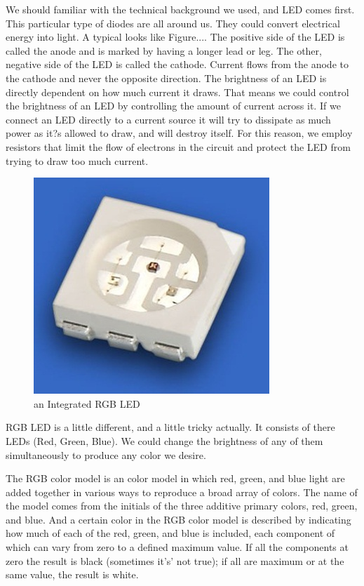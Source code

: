 \documentclass[12pt,a4paper,journal]{IEEEtran}
\begin{document}
We should familiar with the technical background we used, and LED comes first. This particular type of diodes are all around us. They could convert electrical energy into light. A typical looks like Figure.... The positive side of the LED is called the anode and is marked by having a longer lead or leg. The other, negative side of the LED is called the cathode. Current flows from the anode to the cathode and never the opposite direction. The brightness of an LED is directly dependent on how much current it draws. That means we could control the brightness of an LED by controlling the amount of current across it. If we connect an LED directly to a current source it will try to dissipate as much power as it?s allowed to draw, and will destroy itself. For this reason, we employ resistors that limit the flow of electrons in the circuit and protect the LED from trying to draw too much current.
\begin{figure}[ht]
  \centering
  \includegraphics[width=0.9\linewidth]{rgbled.jpg}
  \caption{an Integrated RGB LED}
  \label{fig:rgbled}
\end{figure}
RGB LED is a little different, and a little tricky actually. It consists of there LEDs (Red, Green, Blue). We could change the brightness of any of them simultaneously to produce any color we desire.

The RGB color model is an color model in which red, green, and blue light are added together in various ways to reproduce a broad array of colors. The name of the model comes from the initials of the three additive primary colors, red, green, and blue. And a certain color in the RGB color model is described by indicating how much of each of the red, green, and blue is included, each component of which can vary from zero to a defined maximum value. If all the components at zero the result is black (sometimes it's' not true); if all are maximum or at the same value, the result is white. 
\end{document}
